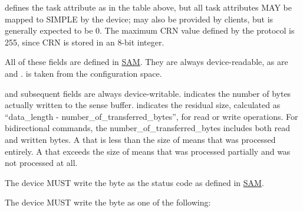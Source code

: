  defines
the task attribute as in the table above, but all task attributes
MAY be mapped to SIMPLE by the device;  may also be provided
by clients, but is generally expected to be 0. The maximum CRN
value defined by the protocol is 255, since CRN is stored in an
8-bit integer.

All of these fields are defined in \hyperref[intro:SAM]{SAM}. They are always
device-readable, as are  and .  is
taken from the configuration space.

 and subsequent fields are always device-writable. 
indicates the number of bytes actually written to the sense
buffer.  indicates the residual size,
calculated as ``data_length - number_of_transferred_bytes'', for
read or write operations. For bidirectional commands, the
number_of_transferred_bytes includes both read and written bytes.
A  that is less than the size of  means that
 was processed entirely. A  that
exceeds the size of  means that  was
processed partially and  was not processed at
all.


The device MUST write the  byte as the status code as
defined in \hyperref[intro:SAM]{SAM}.

The device MUST write the  byte as one of the following:

